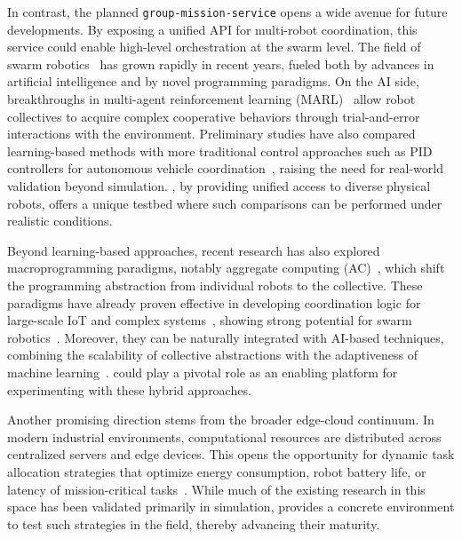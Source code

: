 \documentclass[conference]{IEEEtran}
\begin{document}
In contrast, 
 the planned \texttt{group-mission-service} opens a wide avenue for future developments. 
% 
By exposing a unified API for multi-robot coordination, 
 this service could enable high-level orchestration at the swarm level. 
% 
The field of swarm robotics~\cite{brambilla2013swarm} has grown rapidly in recent years, 
 fueled both by advances in artificial intelligence and by novel programming paradigms. 
% 
On the AI side, 
 breakthroughs in multi-agent reinforcement learning (MARL)~\cite{DBLP:journals/tsmc/BusoniuBS08,malucelli2025sac} 
 allow robot collectives to acquire complex cooperative behaviors 
 through trial-and-error interactions with the environment. 
% 
Preliminary studies have also compared learning-based methods with more traditional control approaches 
 such as PID controllers for autonomous vehicle coordination~\cite{DBLP:conf/smartcomp/BravettiBTAOG25}, 
 raising the need for real-world validation beyond simulation. 
% 
\approach{}, by providing unified access to diverse physical robots, 
 offers a unique testbed where such comparisons can be performed under realistic conditions.

Beyond learning-based approaches, 
 recent research has also explored macroprogramming paradigms, 
 notably aggregate computing (AC)~\cite{beal2015computer,cortecchia2024acsossymp}, 
 which shift the programming abstraction from individual robots to the collective. 
% 
These paradigms have already proven effective in developing coordination logic for large-scale IoT 
 and complex systems~\cite{cortecchia2024acsos},
 showing strong potential for swarm robotics~\cite{aguzzi2025lmcs,DBLP:conf/coordination/AguzziBBCCDFPV25}. 
% 
Moreover, they can be naturally integrated with AI-based techniques, 
 combining the scalability of collective abstractions with the adaptiveness 
 of machine learning~\cite{domini2024scp}. 
% 
\approach{} could play a pivotal role as an enabling platform for experimenting with these hybrid approaches.

Another promising direction stems from the broader edge-cloud continuum. 
%
In modern industrial environments, 
 computational resources are distributed across centralized servers and edge devices. 
% 
This opens the opportunity for dynamic task allocation strategies that optimize 
 energy consumption, robot battery life, or latency 
 of mission-critical tasks~\cite{domini2024woa}. 
% 
While much of the existing research in this space has been validated primarily in simulation, 
 \approach{} provides a concrete environment to test such strategies in the field, 
 thereby advancing their maturity.
\end{document}
